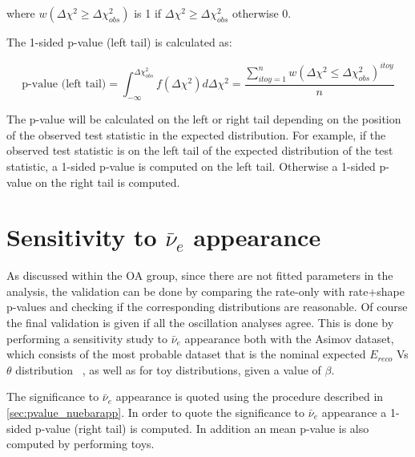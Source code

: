 \begin{itemize}
	where $w(\Delta \chi^2  \geq \Delta \chi^2 _{obs})$ is 1 if $\Delta \chi^2  \geq \Delta \chi^2 _{obs}$ otherwise 0.

	The 1-sided p-value (left tail) is calculated as:

	\begin{equation}
	\text{p-value (left tail)} = \int^{\Delta \chi^2_{obs}}_{-\infty} f(\Delta \chi^2) d \Delta \chi^2  = 
		\frac{ \sum_{ itoy=1 }^{n} w(\Delta \chi^2 \leq \Delta \chi^2_{obs} )^{itoy} }{ n }
	\end{equation}
	\label{eq:pvalue_rateonly}
	
\end{itemize}

The p-value will be calculated on the left or right tail depending on the position of the observed test statistic
in the expected distribution. For example, if the observed test statistic is on the left tail of the expected distribution of the
test statistic, a 1-sided p-value is computed on the left tail. Otherwise a 1-sided p-value on the right tail is computed. 


\clearpage


\section {Sensitivity to $\bar{\nu}_e$ appearance}
\label{sec:sensitivity_nuebarapp}

As discussed within the OA group, 
since there are not fitted parameters in the analysis, the validation can 
be done by comparing the rate-only with rate+shape p-values and 
checking if the corresponding distributions are reasonable.
Of course the final validation is given if all the oscillation analyses agree.
This is done by performing a sensitivity study to $\bar{\nu}_e$ appearance
both with the Asimov dataset, which consists of the most probable dataset
that is the nominal expected $E_{reco}$ Vs $\theta$ distribution ~\cite{Asimov},
as well as for toy distributions, given a value of $\beta$.

The significance to $\bar{\nu}_e$ appearance is quoted 
using the procedure described in \cref{sec:pvalue_nuebarapp}.
In order to quote the significance to $\bar{\nu}_e$ appearance a 1-sided p-value (right tail) is computed.
In addition an mean p-value is also computed by performing \NumToysLarge toys.

